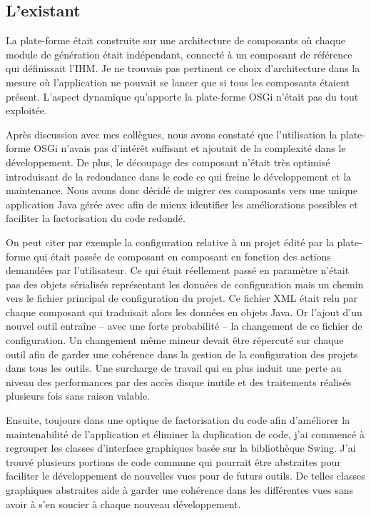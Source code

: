 \subsection{L'existant}
La plate-forme était construite sur une architecture de composants  où chaque module de génération était
indépendant, connecté à un composant de référence qui définissait l'IHM. Je ne trouvais pas pertinent ce choix d'architecture
dans la mesure où l'application ne pouvait se lancer que si tous les composants étaient présent. L'aspect dynamique
qu'apporte la plate-forme OSGi n'était pas du tout exploitée.

Après discussion avec mes collègues, nous avons constaté que l'utilisation la plate-forme OSGi n'avais pas d'intérêt suffisant et ajoutait de la complexité
dans le développement. De plus, le découpage des composant n'était très optimisé introduisant de la redondance dans le code ce qui
freine le développement et la maintenance. Nous avons donc décidé de migrer ces composants vers une unique application Java gérée
avec  afin de mieux identifier les améliorations possibles et faciliter la factorisation du code redondé.

On peut citer par exemple la configuration relative à un projet édité par la plate-forme qui était passée de composant en composant en fonction des actions demandées par l'utilisateur. Ce qui était réellement passé en paramètre n'était pas des objets sérialisés représentant les données de configuration mais un chemin vers le fichier principal de configuration du projet. Ce fichier XML était relu par chaque composant qui traduisait alors les données en objets Java. Or l'ajout d'un nouvel outil entraîne -- avec une forte probabilité -- la changement de ce fichier de configuration. Un changement même mineur devait être répercuté sur chaque outil afin de garder une cohérence dans la gestion de la configuration des projets dans tous les outils. Une surcharge de travail qui en plus induit une perte au niveau des performances par des accès disque inutile et des traitements réalisés plusieurs fois sans raison valable.

Ensuite, toujours dans une optique de factorisation du code afin d'améliorer la maintenabilité de l'application et éliminer la duplication de code, j'ai commencé à regrouper les classes d'interface graphiques basée sur la bibliothèque Swing. J'ai trouvé plusieurs portions de code commune qui pourrait être abstraites pour faciliter le développement de nouvelles vues pour de futurs outils. De telles classes graphiques abstraites aide à garder une cohérence dans les différentes vues sans avoir à s'en soucier à chaque nouveau développement.

